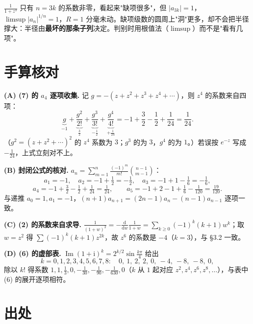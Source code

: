 \documentclass[11pt,a4paper]{ctexart}
\theoremstyle{definition}
\newcommand{\dd}{\mathrm{d}}
\DeclareMathOperator{\Imag}{Im}
\newcommand{\ii}{\mathrm{i}}
\begin{document}
\begin{warnbox}
$\frac1{1+z^3}$ 只有 $n=3k$ 的系数非零，看起来"缺项很多"，但 $|a_{3k}|=1$，$\limsup|a_n|^{1/n}=1$，$R=1$ 分毫未动。缺项级数的圆周上"洞"更多，却不会把半径撑大：半径由\textbf{最坏的那条子列}决定。判别时用根值法（$\limsup$）而不是"看有几项"。
\end{warnbox}

\section{手算核对}\label{sec:hand}

\textbf{(A) (7) 的 $a_4$ 逐项收集.} 记 $g=-(z+z^2+z^3+z^4+\cdots)$，则 $z^4$ 的系数来自四项：
\[
\underbrace{g}_{-1}+\underbrace{\frac{g^2}{2!}}_{\frac32}+\underbrace{\frac{g^3}{3!}}_{-\frac12}+\underbrace{\frac{g^4}{4!}}_{+\frac1{24}}
=-1+\frac32-\frac12+\frac1{24}=\frac1{24}.
\]
（$g^2=(z+z^2+\cdots)^2$ 的 $z^4$ 系数为 $3$；$g^3$ 的为 $3$，$g^4$ 的为 $1$。）若误按 $e^{-z}$ 写成 $-\frac1{24}$，上式立刻对不上。

\textbf{(B) 封闭公式的核对.} $a_n=\sum_{m=1}^{n}\frac{(-1)^m}{m!}\binom{n-1}{m-1}$：
\[
a_1=-1,\quad a_2=-1+\tfrac12=-\tfrac12,\quad a_3=-1+1-\tfrac16=-\tfrac16,
\]
\[
a_4=-1+\tfrac32-\tfrac12+\tfrac1{24}=\tfrac1{24},\qquad
a_5=-1+2-1+\tfrac16-\tfrac1{120}=\tfrac{19}{120}.
\]
与递推 $a_0=1,a_1=-1$，$(n+1)a_{n+1}=(2n-1)a_n-(n-1)a_{n-1}$ 逐项一致。

\textbf{(C) (2) 的系数来自求导.} $\frac{1}{(1+w)^2}=-\frac{\dd}{\dd w}\frac{1}{1+w}=\sum_{k\ge0}(-1)^k(k+1)w^k$；取 $w=z^2$ 得 $\sum(-1)^k(k+1)z^{2k}$，故 $z^6$ 的系数是 $-4$（$k=3$），与 \S3.2 一致。

\textbf{(D) (6) 的虚部表.} $\Imag(1+\ii)^k=2^{k/2}\sin\frac{k\pi}{4}$ 给出
\[
k=0,1,2,3,4,5,6,7,8:\quad 0,\ 1,\ 2,\ 2,\ 0,\ -4,\ -8,\ -8,\ 0,
\]
除以 $k!$ 得系数 $1,1,\frac13,0,-\frac1{30},-\frac1{90},-\frac1{630},0$（$k$ 从 $1$ 起对应 $z^2,z^4,z^6,z^8,\dots$），与表中 (6) 的展开逐项相符。

\section{出处}
\end{document}

